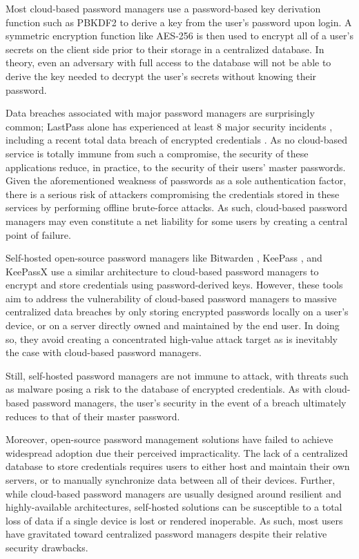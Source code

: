 Most cloud-based password managers use a password-based key derivation function such as PBKDF2 to derive a key from the user's password upon login.
A symmetric encryption function like AES-256 \cite{fips197} is then used to encrypt all of a user's secrets on the client side prior to their storage in a centralized database.
In theory, even an adversary with full access to the database will not be able to derive the key needed to decrypt the user's secrets without knowing their password.

Data breaches associated with major password managers are surprisingly common; LastPass alone has experienced at least 8 major security incidents \cite{lastpass_security}, including a recent total data breach of encrypted credentials \cite{toubba_notice_2022}. As no cloud-based service is totally immune from such a compromise, the security of these applications reduce, in practice, to the security of their users' master passwords. Given the aforementioned weakness of passwords as a sole authentication factor, there is a serious risk of attackers compromising the credentials stored in these services by performing offline brute-force attacks. As such, cloud-based password managers may even constitute a net liability for some users by creating a central point of failure.

Self-hosted open-source password managers like Bitwarden \cite{bitwarden}, KeePass \cite{reichl_keepass_nodate}, and KeePassX \cite{keepassx} use a similar architecture to cloud-based password managers to encrypt and store credentials using password-derived keys. However, these tools aim to address the vulnerability of cloud-based password managers to massive centralized data breaches by only storing encrypted passwords locally on a user's device, or on a server directly owned and maintained by the end user. 
In doing so, they avoid creating a concentrated high-value attack target as is inevitably the case with cloud-based password managers.

Still, self-hosted password managers are not immune to attack, with threats such as malware posing a risk to the database of encrypted credentials.
As with cloud-based password managers, the user's security in the event of a breach ultimately reduces to that of their master password.

Moreover, open-source password management solutions have failed to achieve widespread adoption due their perceived impracticality. The lack of a centralized database to store credentials requires users to either host and maintain their own servers, or to manually synchronize data between all of their devices. Further, while cloud-based password managers are usually designed around resilient and highly-available architectures, self-hosted solutions can be susceptible to a total loss of data if a single device is lost or rendered inoperable.
As such, most users have gravitated toward centralized password managers despite their relative security drawbacks.

